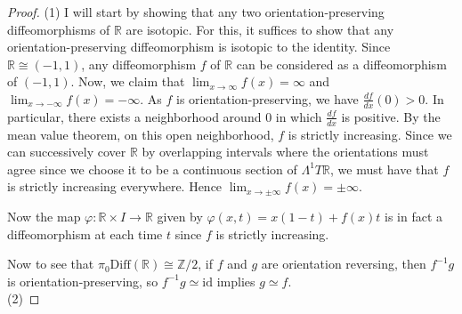 \documentclass[reqno]{amsart}
\theoremstyle{definition}
\theoremstyle{remark}
\newcommand{\id}{{\mathrm{id}}}
\newcommand{\Diff}{{\mathrm{Diff}}}
\begin{document}
    \begin{proof}
        (1) I will start by showing that any
        two orientation-preserving diffeomorphisms
        of $\mathbb{R}$ are isotopic.
        For this, it suffices to show that
        any orientation-preserving diffeomorphism
        is isotopic to the identity.
        Since  $\mathbb{R} \cong (-1,1)$, any 
        diffeomorphism 
        $f$ of $\mathbb{R}$ can be considered as
        a diffeomorphism of $\left( -1,1 \right) $. 
        Now, we claim that
        $\lim_{x \to \infty}f(x) = \infty$ and
        $\lim_{x \to -\infty} f(x) = -\infty$.
        As $f$ is orientation-preserving, we
        have  $\frac{df}{dx}(0) > 0$.
        In particular, there exists a neighborhood 
        around $0$ in which $\frac{df}{dx}$ is positive. 
        By the mean value theorem, on this open neighborhood,
        $f$ is strictly increasing. Since we can successively cover
        $\mathbb{R} $ by overlapping intervals where
        the orientations must agree since
        we choose it to be a continuous section of
        $\Lambda^{1} T\mathbb{R}$, we must have
        that $f$ is strictly increasing everywhere. Hence
        $\lim_{x \to \pm \infty}f(x) = \pm \infty$.

        Now the map
        $\varphi \colon \mathbb{R} \times I \to \mathbb{R}$ 
        given by
        $\varphi (x,t) = x(1-t) + f (x) t$ is in fact
        a diffeomorphism at
        each time $t$ since $f$ is strictly increasing.

        Now to see that
        $\pi_0 \Diff \left( \mathbb{R} \right) 
        \cong \mathbb{Z}/2$, if $f$ and $g$ are orientation 
        reversing, then
        $f^{-1} g$ is orientation-preserving, so
        $f^{-1} g \simeq \id$ implies
        $g \simeq f$.\\
        \linebreak
        (2) 
        

\end{proof}
\end{document}
